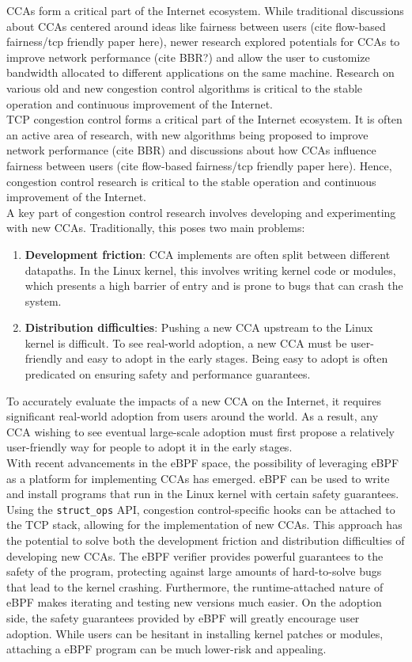 \documentclass[../main.tex]{subfiles}
\begin{document}
CCAs form a critical part of the Internet ecosystem. While traditional discussions about CCAs centered around ideas like fairness between users (cite flow-based fairness/tcp friendly paper here), newer research explored potentials for CCAs to improve network performance (cite BBR?) and allow the user to customize bandwidth allocated to different applications on the same machine. Research on various old and new congestion control algorithms is critical to the stable operation and continuous improvement of the Internet. \\
TCP congestion control forms a critical part of the Internet ecosystem. It is often an active area of research, with new algorithms being proposed to improve network performance (cite BBR) and discussions about how CCAs influence fairness between users (cite flow-based fairness/tcp friendly paper here). Hence, congestion control research is critical to the stable operation and continuous improvement of the Internet.\\
A key part of congestion control research involves developing and experimenting with new CCAs. Traditionally, this poses two main problems:
\begin{enumerate}
    \item {\bf Development friction}: CCA implements are often split between different datapaths. In the Linux kernel, this involves writing kernel code or modules, which presents a high barrier of entry and is prone to bugs that can crash the system.
    \item {\bf Distribution difficulties}: Pushing a new CCA upstream to the Linux kernel is difficult. To see real-world adoption, a new CCA must be user-friendly and easy to adopt in the early stages. Being easy to adopt is often predicated on ensuring safety and performance guarantees.
\end{enumerate}
To accurately evaluate the impacts of a new CCA on the Internet, it requires significant real-world adoption from users around the world. As a result, any CCA wishing to see eventual large-scale adoption must first propose a relatively user-friendly way for people to adopt it in the early stages. \\
With recent advancements in the eBPF space, the possibility of leveraging eBPF as a platform for implementing CCAs has emerged. eBPF \cite{ebpf} can be used to write and install programs that run in the Linux kernel with certain safety guarantees. Using the \texttt{struct\_ops} API, congestion control-specific hooks can be attached to the TCP stack, allowing for the implementation of new CCAs. This approach has the potential to solve both the development friction and distribution difficulties of developing new CCAs. The eBPF verifier provides powerful guarantees to the safety of the program, protecting against large amounts of hard-to-solve bugs that lead to the kernel crashing. Furthermore, the runtime-attached nature of eBPF makes iterating and testing new versions much easier. On the adoption side, the safety guarantees provided by eBPF will greatly encourage user adoption. While users can be hesitant in installing kernel patches or modules, attaching a eBPF program can be much lower-risk and appealing. \\
\end{document}
